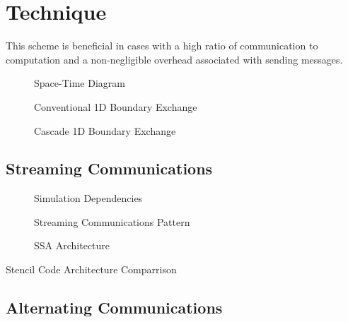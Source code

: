 \section{Technique}


This scheme is beneficial in cases with a high ratio of communication to computation and a non-negligible overhead associated with sending messages.


\begin{figure}
  \centering
  
  \caption{Space-Time Diagram}
  \label{fig:lightcone}
\end{figure}


\begin{figure}
  \centering
  
  \caption{Conventional 1D Boundary Exchange}
  \label{fig:exch1d}
\end{figure}

\begin{figure}
  \centering
  
  \caption{Cascade 1D Boundary Exchange}
  \label{fig:casc1d}
\end{figure}

\subsection{Streaming Communications}
\begin{figure}
  \centering
  
  \caption{Simulation Dependencies}
  \label{fig:simcone}
\end{figure}

\begin{figure}
  \centering
  
  \caption{Streaming Communications Pattern}
  \label{fig:streamingcomms}
\end{figure}

\begin{figure}
  \centering
  
  \caption{SSA Architecture}
  \label{fig:ssa_concept}
\end{figure}


\begin{table}
  \scriptsize
  \centering
  \caption{Stencil Code Architecture Comparrison}
  \label{tab:comparrison}
  
\end{table}

\subsection{Alternating Communications}

